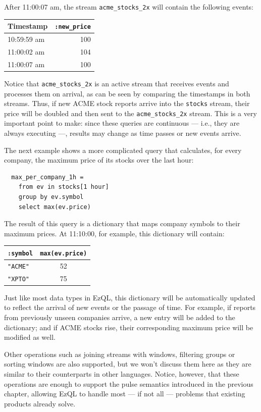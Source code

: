 \documentclass{report}
\begin{document}
After 11:00:07 am, the stream \verb=acme_stocks_2x= will contain the
following events:

\begin{tabular}{ |l|r| }
  \hline
  Timestamp & \verb=:new_price= \\
  \hline
  10:59:59 am & 100 \\
  11:00:02 am & 104 \\
  11:00:07 am & 100 \\
  \hline
\end{tabular}

Notice that \verb=acme_stocks_2x= is an active stream that receives
events and processes them on arrival, as can be seen by comparing the
timestamps in both streams. Thus, if new ACME stock reports arrive
into the \verb=stocks= stream, their price will be doubled and then
sent to the \verb=acme_stocks_2x= stream. This is a very important
point to make: since these queries are continuous --- i.e., they are
always executing ---, results may change as time passes or new events
arrive.

The next example shows a more complicated query that calculates, for
every company, the maximum price of its stocks over the last hour:

\begin{lstlisting}
  max_per_company_1h =
    from ev in stocks[1 hour]
    group by ev.symbol
    select max(ev.price)
\end{lstlisting}

The result of this query is a dictionary that maps company symbols to
their maximum prices. At 11:10:00, for example, this dictionary will
contain:

\begin{tabular}{ |l|c| }
  \hline
  \verb=:symbol= & \verb=max(ev.price)= \\
  \hline
  \verb="ACME"= & 52 \\
  \verb="XPTO"= & 75 \\
  \hline
\end{tabular}

Just like most data types in EzQL, this dictionary will be
automatically updated to reflect the arrival of new events or the
passage of time. For example, if reports from previously unseen
companies arrive, a new entry will be added to the dictionary; and if
ACME stocks rise, their corresponding maximum price will be modified
as well.

Other operations such as joining streams with windows, filtering
groups or sorting windows are also supported, but we won't discuss
them here as they are similar to their counterparts in other
languages. Notice, however, that these operations are enough to
support the pulse semantics introduced in the previous chapter,
allowing EzQL to handle most --- if not all --- problems that existing
products already solve.
\end{document}
